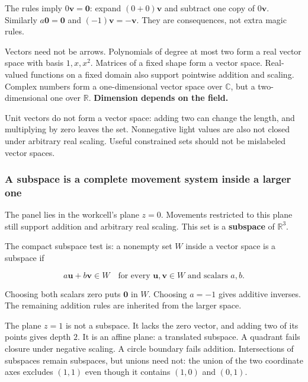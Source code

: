 The rules imply \(0\mathbf v=\mathbf0\): expand \((0+0)\mathbf v\) and subtract one copy of \(0\mathbf v\). Similarly \(a\mathbf0=\mathbf0\) and \((-1)\mathbf v=-\mathbf v\). They are consequences, not extra magic rules.

Vectors need not be arrows. Polynomials of degree at most two form a real vector space with basis \(1,x,x^2\). Matrices of a fixed shape form a vector space. Real-valued functions on a fixed domain also support pointwise addition and scaling. Complex numbers form a one-dimensional vector space over \(\mathbb C\), but a two-dimensional one over \(\mathbb R\). \textbf{Dimension depends on the field.}

Unit vectors do not form a vector space: adding two can change the length, and multiplying by zero leaves the set. Nonnegative light values are also not closed under arbitrary real scaling. Useful constrained sets should not be mislabeled vector spaces.

\subsubsection{A subspace is a complete movement system inside a larger one}\label{01-foundations-i-ch017-a-subspace-is-a-complete-movement-system-inside-a-larger-one}

\hypertarget{01-foundations-i-ch017-a-subspace-is-a-complete-movement-system-inside-a-larger-one}{}

The panel lies in the workcell's plane \(z=0\). Movements restricted to this plane still support addition and arbitrary real scaling. This set is a \textbf{subspace} of \(\mathbb R^3\).

The compact subspace test is: a nonempty set \(W\) inside a vector space is a subspace if

\[
a\mathbf u+b\mathbf v\in W
\quad\text{for every }\mathbf u,\mathbf v\in W
\text{ and scalars }a,b.
\]

Choosing both scalars zero puts \(\mathbf0\) in \(W\). Choosing \(a=-1\) gives additive inverses. The remaining addition rules are inherited from the larger space.

The plane \(z=1\) is not a subspace. It lacks the zero vector, and adding two of its points gives depth \(2\). It is an affine plane: a translated subspace. A quadrant fails closure under negative scaling. A circle boundary fails addition. Intersections of subspaces remain subspaces, but unions need not: the union of the two coordinate axes excludes \((1,1)\) even though it contains \((1,0)\) and \((0,1)\).

